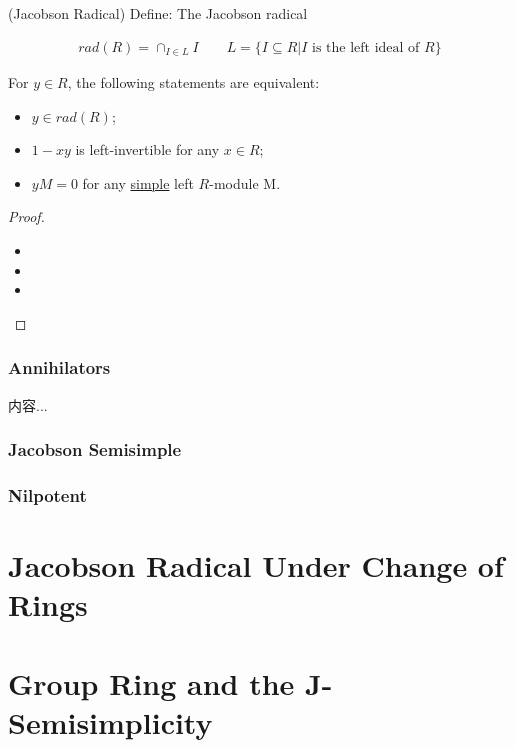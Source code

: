 \documentclass[Total.tex]{subfiles}
\begin{document}
	\begin{Def}
		(Jacobson Radical) Define: The Jacobson radical
		
		\begin{gather*}
			rad(R)=\cap_{I\in L} I\qquad L=\{I\subseteq R|I\mbox{ is the left ideal of }R\}
		\end{gather*}
	\end{Def}
	
	\begin{lemma}
		For $y\in R$, the following statements are equivalent:
		
		\begin{itemize}
			\item $y\in rad(R)$;
			\item $1-xy$ is left-invertible for any $x\in R$;
			\item $yM=0$ for any \underline{simple} left $R$-module M.
		\end{itemize}
	\end{lemma}
	
	\begin{proof}
		\begin{itemize}
			\item 
			\item 
			\item 
		\end{itemize}
	\end{proof}
	
	\subsubsection{Annihilators}
	
	\begin{Def}
		内容...
	\end{Def}
	\subsubsection{Jacobson Semisimple}
	\subsubsection{Nilpotent}
	
	\section{Jacobson Radical Under Change of Rings}
	
	\section{Group Ring and the J-Semisimplicity}
	
\end{document}
